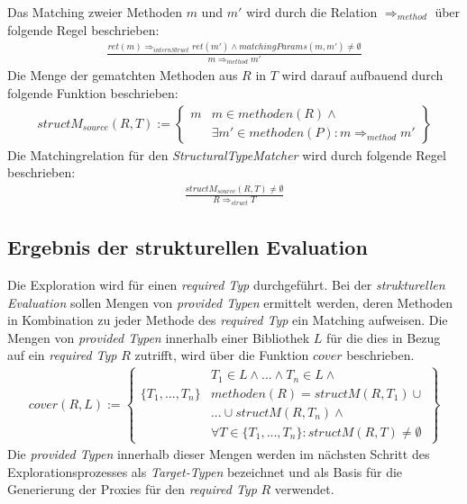 \noindent
Das Matching zweier Methoden $m$ und $m'$ wird durch die Relation $\Rightarrow_{method}$ über folgende Regel beschrieben:
\begin{gather*}
\frac{\mathit{ret(m)} \Rightarrow_{internStruct} \mathit{ret(m')} \wedge \mathit{matchingParams(m,m')} \neq \emptyset}{m \Rightarrow_{method} m'}
\end{gather*}
\noindent
Die Menge der gematchten Methoden aus $R$ in $T$ wird darauf aufbauend durch folgende Funktion beschrieben:
\begin{gather*}
structM_{source}(R,T) := \left\{ 
				\begin{array}{l|l}
m	& \mathit{m} \in \mathit{methoden(R)} \wedge \mathit{ }
\\
	& \exists \mathit{m'} \in \mathit{methoden(P)} : m \Rightarrow_{method} m'
				\end{array}
              \right\}
\end{gather*}
\noindent
Die Matchingrelation für den \emph{StructuralTypeMatcher} wird durch folgende Regel beschrieben:
\begin{gather*}
\frac{structM_{source}(R,T) \neq \emptyset}{R \Rightarrow_{struct}T}
\end{gather*}


\subsection{Ergebnis der strukturellen Evaluation}\label{sec_ergStructEval}
Die Exploration wird für einen \emph{required Typ} durchgeführt. Bei der \emph{strukturellen Evaluation} sollen Mengen von \emph{provided Typen} ermittelt werden, deren Methoden in Kombination zu jeder Methode des \emph{required Typ} ein Matching aufweisen. Die Mengen von \emph{provided Typen} innerhalb einer Bibliothek $L$ für die dies in Bezug auf ein \emph{required Typ} $R$ zutrifft, wird über die Funktion $cover$ beschrieben.
\begin{gather*}
cover(R,L) := 
\left\{\begin{array}{l|l}
					& T_1 \in L \wedge \text{...} \wedge T_n \in L 								\wedge \mathit{ }\\
\{T_1,...,T_n\}		& \mathit{methoden(R)} = \mathit{structM(R,T_1)}							\cup \mathit{ }\\
					& \texttt{...} \cup \mathit{structM(R, T_n)} 								\wedge \mathit{ }\\
					& \forall T \in \{T_1,...,T_n\}:											\mathit{structM(R,T)} \neq \emptyset
\end{array}\right\}
\end{gather*}
Die \emph{provided Typen} innerhalb dieser Mengen werden im nächsten Schritt des Explorationsprozesses als \emph{Target-Typen} bezeichnet und als Basis für die Generierung der Proxies für den \emph{required Typ} $R$ verwendet.

